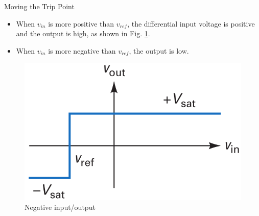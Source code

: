 \documentclass[pdflatex,compress]{beamer}
\begin{document}
\begin{frame}{Moving the Trip Point}
	\begin{multicols}{2}
		\begin{itemize}
			\item When $v_{in}$ is more positive than $v_{ref}$, the differential input voltage is positive and the output is high, as shown in Fig. \ref{fig:2011d}.
			\item When $v_{in}$ is more negative than $v_{ref}$, the output is low.
		\end{itemize}
		\vfill\null
		\columnbreak
		\begin{figure}
			\centering
			\includegraphics[width=\linewidth]{img/2011d}
			\caption{Negative input/output}
			\label{fig:2011d}
		\end{figure}
	\end{multicols}
\end{frame}
\end{document}
